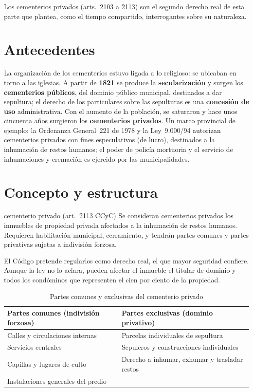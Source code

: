 \documentclass[12pt,oneside]{book}
\begin{document}
Los cementerios privados (arts.~2103 a 2113) son el segundo derecho real de esta parte que plantea, como el tiempo compartido, interrogantes sobre su naturaleza.

\section{Antecedentes}

La organización de los cementerios estuvo ligada a lo religioso: se ubicaban en torno a las iglesias. A partir de \textbf{1821} se produce la \textbf{secularización} y surgen los \textbf{cementerios públicos}, del dominio público municipal, destinados a dar sepultura; el derecho de los particulares sobre las sepulturas es una \textbf{concesión de uso} administrativa. Con el aumento de la población, se saturaron y hace unos cincuenta años surgieron los \textbf{cementerios privados}. Un marco provincial de ejemplo: la Ordenanza General~221 de 1978 y la Ley~9.000/94 autorizan cementerios privados con fines especulativos (de lucro), destinados a la inhumación de restos humanos; el poder de policía mortuoria y el servicio de inhumaciones y cremación es ejercido por las municipalidades.

\section{Concepto y estructura}

\begin{definicion}{cementerio privado (art.~2113 CCyC)}
Se consideran cementerios privados los inmuebles de propiedad privada afectados a la inhumación de restos humanos. Requieren habilitación municipal, cerramiento, y tendrán partes comunes y partes privativas sujetas a indivisión forzosa.
\end{definicion}

El Código pretende regularlos como derecho real, el que mayor seguridad confiere. Aunque la ley no lo aclara, pueden afectar el inmueble el titular de dominio y todos los condóminos que representen el cien por ciento de la propiedad.

\begin{table}[H]
\centering
\small
\begin{tabularx}{\textwidth}{>{\raggedright\arraybackslash}X>{\raggedright\arraybackslash}X}
\toprule
\textbf{Partes comunes (indivisión forzosa)} & \textbf{Partes exclusivas (dominio privativo)} \\
\midrule
Calles y circulaciones internas & Parcelas individuales de sepultura \\
Servicios centrales & Sepulcros y construcciones individuales \\
Capillas y lugares de culto & Derecho a inhumar, exhumar y trasladar restos \\
Instalaciones generales del predio & \\
\bottomrule
\end{tabularx}
\caption{Partes comunes y exclusivas del cementerio privado}
\end{table}
\end{document}
